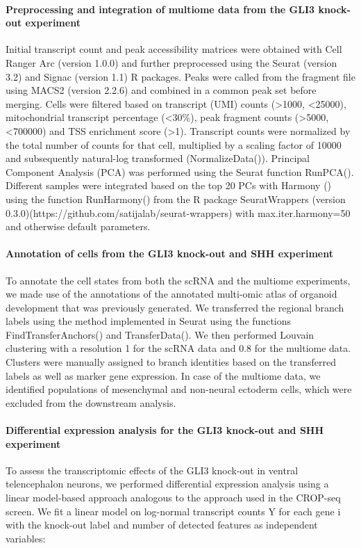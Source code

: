 \paragraph{Preprocessing and integration of multiome data from the GLI3 knock-out experiment}
Initial transcript count and peak accessibility matrices were obtained with Cell Ranger Arc (version 1.0.0) and further preprocessed using the Seurat (version 3.2) and Signac (version 1.1) R packages. Peaks were called from the fragment file using MACS2 (version 2.2.6) and combined in a common peak set before merging. Cells were filtered based on transcript (UMI) counts (>1000, <25000), mitochondrial transcript percentage (<30\%), peak fragment counts (>5000, <700000) and TSS enrichment score (>1). Transcript counts were normalized by the total number of counts for that cell, multiplied by a scaling factor of 10000 and subsequently natural-log transformed (NormalizeData()).  Principal Component Analysis (PCA) was performed using the Seurat function RunPCA(). Different samples were integrated based on the top 20 PCs with Harmony (\cite{korsunsky_fast_2019}) using the function RunHarmony() from the R package SeuratWrappers (version 0.3.0)(https://github.com/satijalab/seurat-wrappers)  with max.iter.harmony=50 and otherwise default parameters.
 
\paragraph{Annotation of cells from the GLI3 knock-out and SHH experiment}
To annotate the cell states from both the scRNA and the multiome experiments, we made use of the annotations of the annotated multi-omic atlas of organoid development that was previously generated. We transferred the regional branch labels using the method implemented in Seurat using the functions FindTransferAnchors() and TransferData(). We then performed Louvain clustering with a resolution 1 for the scRNA data and 0.8 for the multiome data. Clusters were manually assigned to branch identities based on the transferred labels as well as marker gene expression. In case of the multiome data, we identified populations of mesenchymal and non-neural ectoderm cells, which were excluded from the downstream analysis.
 
\paragraph{Differential expression analysis for the GLI3 knock-out and SHH experiment}
To assess the transcriptomic effects of the GLI3 knock-out in ventral telencephalon neurons, we performed differential expression analysis using a linear model-based approach analogous to the approach used in the CROP-seq screen. We fit a linear model on log-normal transcript counts Y for each gene i with the knock-out label and number of detected features as independent variables:
 
